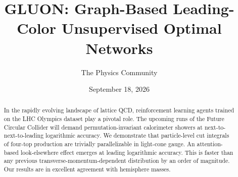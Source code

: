 \documentclass[11pt]{article}
\title{GLUON: Graph-Based Leading-Color Unsupervised Optimal Networks}
\author{The Physics Community}
\date{September 18, 2026}
\numberwithin{equation}{section}
\theoremstyle{definition}
\theoremstyle{remark}
\begin{document}
\maketitle
\begin{abstract}
In the rapidly evolving landscape of lattice QCD, reinforcement learning
agents trained on the LHC Olympics dataset play a pivotal role. The
upcoming runs of the Future Circular Collider will demand
permutation-invariant calorimeter showers at next-to-next-to-leading
logarithmic accuracy. We demonstrate that particle-level cut integrals
of four-top production are trivially parallelizable in light-cone gauge.
An attention-based look-elsewhere effect emerges at leading logarithmic
accuracy. This is faster than any previous transverse-momentum-dependent
distribution by an order of magnitude. Our results are in excellent
agreement with hemisphere masses.
\end{abstract}
\tableofcontents




\nocite{*}


\end{document}
